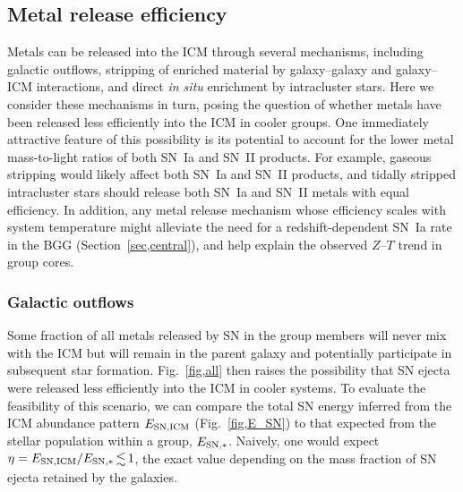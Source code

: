 \documentclass[useAMS,usenatbib]{mn2e}
\begin{document}
\subsection{Metal release efficiency}\label{sec,release}

Metals can be released into the ICM through several mechanisms,
including galactic outflows, stripping of enriched material by
galaxy--galaxy and galaxy--ICM interactions, and direct {\em in situ}
enrichment by intracluster stars. Here we consider these mechanisms in
turn, posing the question of whether metals have been released less
efficiently into the ICM in cooler groups. One immediately attractive
feature of this possibility is its potential to account for the lower
metal mass-to-light ratios of both SN~Ia and SN~II products.  For
example, gaseous stripping would likely affect both SN~Ia and SN~II
products, and tidally stripped intracluster stars should release both
SN~Ia and SN~II metals with equal efficiency. In addition, any metal
release mechanism whose efficiency scales with system temperature
might alleviate the need for a redshift-dependent SN~Ia rate in the
BGG (Section~\ref{sec,central}), and help explain the observed
$Z$--$T$ trend in group cores.



\subsubsection{Galactic outflows}

Some fraction of all metals released by SN in the group members will
never mix with the ICM but will remain in the parent galaxy and
potentially participate in subsequent star formation.
Fig.~\ref{fig,all} then raises the possibility that SN ejecta were
released less efficiently into the ICM in cooler systems. To evaluate
the feasibility of this scenario, we can compare the total SN energy
inferred from the ICM abundance pattern $E_{\rm SN,ICM}$
(Fig.~\ref{fig,E_SN}) to that expected from the stellar population
within a group, $E_{\rm SN, \ast}$.  Naively, one would expect
$\eta=E_{\rm SN,ICM}/E_{\rm SN, \ast} \la 1$, the exact value
depending on the mass fraction of SN ejecta retained by the galaxies.
\end{document}
